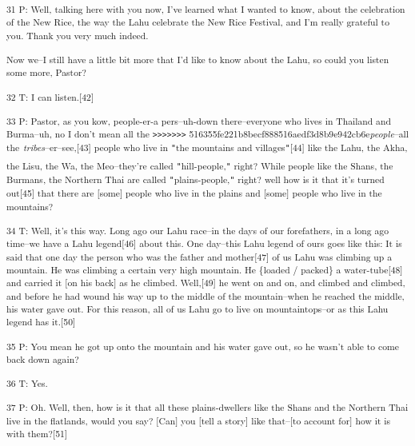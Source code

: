 \textsuperscript{31 P: Well, talking here with you now, I've learned what I wanted
to know, about the celebration of the New Rice, the way the Lahu celebrate the
New Rice Festival, and I'm really grateful to you. Thank you very much indeed.
}

\textsuperscript{Now we--I still have a little bit more that I'd like to know about
the Lahu, so could you listen some more, Pastor?}

\textsuperscript{32 T: I can listen.[42]}

\textsuperscript{33 P: Pastor, as you kow, people-er-a pers--uh-down there--everyone
who lives in Thailand and Burma--uh, no I don't mean all the \texttt{>}\texttt{>}\texttt{>}\texttt{>}\texttt{>}\texttt{>}\texttt{>}
516355fe221b8becf888516aedf3d8b9e942cb6e}\textsuperscript{\textit{people}}\textsuperscript{--all
the }\textsuperscript{\textit{tribes}}\textsuperscript{--er--see,[43] people who
live in \texttt{"}the mountains and villages\texttt{"}[44] like the Lahu, the Akha,
the Lisu, the Wa, the Meo--they're called \texttt{"}hill-people,\texttt{"} right?
While people like the Shans, the Burmans, the Northern Thai are called \texttt{"}plains-people,\texttt{"}
right? well how is it that it's turned out[45] that there are [some] people who
live in the plains and [some] people who live in the mountains? }

\textsuperscript{34 T: Well, it's this way. Long ago our Lahu race--in the days
of our forefathers, in a long ago time--we have a Lahu legend[46] about this. One
day--this Lahu legend of ours goes like this: It is said that one day the person
who was the father and mother[47] of us Lahu was climbing up a mountain. He was
climbing a certain very high mountain. He \{loaded / packed\} a water-tube[48]
and carried it [on his back] as he climbed. Well,[49] he went on and on, and climbed
and climbed, and before he had wound his way up to the middle of the mountain--when
he reached the middle, his water gave out. For this reason, all of us Lahu go to
live on mountaintops--or as this Lahu legend has it.[50]}

\textsuperscript{35 P: You mean he got up onto the mountain and his water gave
out, so he wasn't able to come back down again?}

\textsuperscript{36 T: Yes.}

\textsuperscript{37 P: Oh. Well, then, how is it that all these plains-dwellers
like the Shans and the Northern Thai live in the flatlands, would you say? [Can]
you [tell a story] like that--[to account for] how it is with them?[51]}

